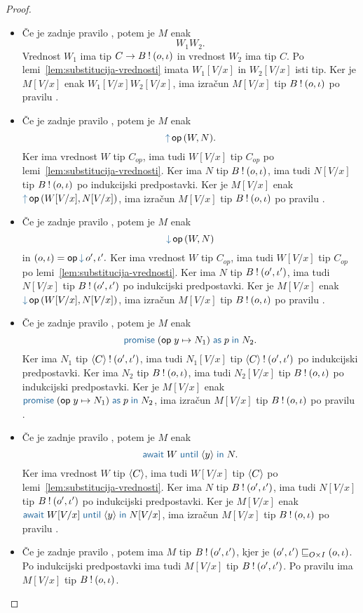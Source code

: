 \begin{proof}
\begin{itemize}
		\item Če je zadnje pravilo , potem je $M$ enak $$W_1 W_2.$$ Vrednost $W_1$ ima tip $C \to B \mathbin{!} (o, \iota)$ in vrednost $W_2$ ima tip $C$.
		Po lemi~\ref{lem:substitucija-vrednosti} imata $W_1[V/x]$ in $W_2[V/x]$ isti tip.
		Ker je $M[V/x]$ enak $W_1[V/x] W_2[V/x]$, ima izračun $M[V/x]$ tip $B \mathbin{!} (o, \iota)$ po pravilu .
		
		\item Če je zadnje pravilo , potem je $M$ enak $$\tmopout{op}{W}{N}.$$
		Ker ima vrednost $W$ tip $C_{op}$, ima tudi $W[V/x]$ tip $C_{op}$ po lemi~\ref{lem:substitucija-vrednosti}.
		Ker ima $N$ tip $B \mathbin{!} (o, \iota)$, ima tudi $N[V/x]$ tip $B \mathbin{!} (o, \iota)$ po indukcijski predpostavki.
		Ker je $M[V/x]$ enak $\tmopout{op}{W[V/x]}{N[V/x]}$, ima izračun $M[V/x]$ tip $B \mathbin{!} (o, \iota)$ po pravilu .
		
		\item Če je zadnje pravilo , potem je $M$ enak $$\tmopin{op}{W}{N}$$ in $(\o, \i) = \opincomp{op}{\o', \i'}.$
		Ker ima vrednost $W$ tip $C_{op}$, ima tudi $W[V/x]$ tip $C_{op}$ po lemi~\ref{lem:substitucija-vrednosti}.
		Ker ima $N$ tip $B \mathbin{!} (o', \iota')$, ima tudi $N[V/x]$ tip $B \mathbin{!} (o', \iota')$ po indukcijski predpostavki.
		Ker je $M[V/x]$ enak $\tmopin{op}{W[V/x]}{N[V/x]}$, ima izračun $M[V/x]$ tip $B \mathbin{!} (o, \iota)$ po pravilu .
		
		\item Če je zadnje pravilo , potem je $M$ enak $$\tmwith{op}{y}{N_1}{p}{N_2}.$$
		Ker ima $N_1$ tip $\langle C \rangle \mathbin{!} (o', \iota')$, ima tudi $N_1[V/x]$ tip $\langle C \rangle \mathbin{!} (o', \iota')$ po indukcijski predpostavki.
		Ker ima $N_2$ tip $B \mathbin{!} (o, \iota)$, ima tudi $N_2[V/x]$ tip $B \mathbin{!} (o, \iota)$ po indukcijski predpostavki.
		Ker je $M[V/x]$ enak $\tmwith{op}{y}{N_1}{p}{N_2}$, ima izračun $M[V/x]$ tip $B \mathbin{!} (o, \iota)$ po pravilu .
		
		\item Če je zadnje pravilo , potem je $M$ enak $$\tmawait{W}{y}{N}.$$
		Ker ima vrednost $W$ tip $\langle C \rangle$, ima tudi $W[V/x]$ tip $\langle C \rangle$ po lemi~\ref{lem:substitucija-vrednosti}.
		Ker ima $N$ tip $B \mathbin{!} (o', \iota')$, ima tudi $N[V/x]$ tip $B \mathbin{!} (o', \iota')$ po indukcijski predpostavki.
		Ker je $M[V/x]$ enak $\tmawait{W[V/x]}{y}{N[V/x]}$, ima izračun $M[V/x]$ tip $B \mathbin{!} (o, \iota)$ po pravilu .
		
		\item Če je zadnje pravilo , potem ima $M$ tip $B \mathbin{!} (o', \iota')$, kjer je $(o', \iota') \sqsubseteq_{O \times I} (o, \iota)$.
		Po indukcijski predpostavki ima tudi $M[V/x]$ tip $B \mathbin{!} (o', \iota')$. Po pravilu  ima $M[V/x]$ tip $B \mathbin{!} (o, \iota)$.
		
	\end{itemize}

\end{proof}

